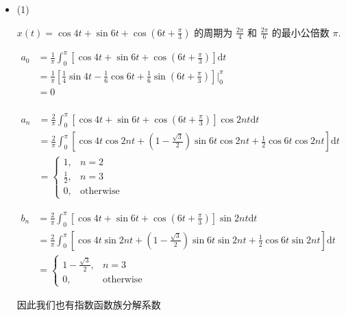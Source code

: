 \documentclass[a4paper,UTF8]{article}
\numberwithin{equation}{section}
\begin{document}
\begin{framed}
\begin{spacing}{1.5}
    \begin{itemize}
      \item (1)

      $\displaystyle x(t) = \cos 4t + \sin 6t + \cos(6t+\frac{\pi}{3})$ 的周期为 $\displaystyle \frac{2\pi}{4}$ 和 $\displaystyle \frac{2\pi}{6}$ 的最小公倍数 $\pi$.
      
      $
      \begin{aligned}
      a_0 & = \frac{1}{\pi}\int_{0}^{\pi}[\cos 4t + \sin 6t + \cos(6t+\frac{\pi}{3})]\mathrm{d}t  \\
      & = \frac{1}{\pi}[\frac{1}{4}\sin 4t - \frac{1}{6}\cos 6t + \frac{1}{6}\sin(6t+\frac{\pi}{3})]|_{0}^{\pi}  \\
      & = 0  \\
      \end{aligned}
      $
      
      $
      \begin{aligned}
      a_n & = \frac{2}{\pi}\int_{0}^{\pi}[\cos 4t + \sin 6t + \cos(6t+\frac{\pi}{3})]\cos 2n t \mathrm{d}t  \\
      & = \frac{2}{\pi}\int_{0}^{\pi}[\cos 4t\cos 2n t + (1 - \frac{\sqrt{3}}{2})\sin 6t\cos 2n t + \frac{1}{2}\cos 6t\cos 2n t] \mathrm{d}t  \\
      & = \begin{cases}
          1, & n = 2 \\
          \frac{1}{2}, & n = 3 \\
          0, & \text{otherwise}
      \end{cases}
      \end{aligned}
      $
      
      $
      \begin{aligned}
      b_n & = \frac{2}{\pi}\int_{0}^{\pi}[\cos 4t + \sin 6t + \cos(6t+\frac{\pi}{3})]\sin 2n t \mathrm{d}t  \\
      & = \frac{2}{\pi}\int_{0}^{\pi}[\cos 4t\sin 2n t + (1 - \frac{\sqrt{3}}{2})\sin 6t\sin 2n t + \frac{1}{2}\cos 6t\sin 2n t] \mathrm{d}t  \\
      & = \begin{cases}
          1-\frac{\sqrt{3}}{2}, & n = 3 \\
          0, & \text{otherwise}
      \end{cases}
      \end{aligned}
      $
      
      因此我们也有指数函数族分解系数
      

\end{itemize}
\end{spacing}
\end{framed}
\end{document}
